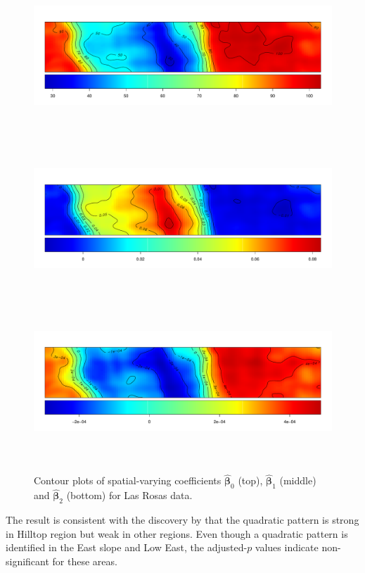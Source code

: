 \documentclass[a4paper]{article}   	%
\begin{document}
	\begin{figure}[!htp]
		\centering	
		\includegraphics[width=\textwidth, height=6cm]{Images/STRand_b0}
		\includegraphics[width=\textwidth, height=6cm]{Images/STRand_b1}
		\includegraphics[width=\textwidth, height=6cm]{Images/STRand_b2}
		\caption{Contour plots of spatial-varying coefficients $\hat{\bm{\beta}}_0$ (top), $\hat{\bm{\beta}}_1$ (middle) and $\hat{\bm{\beta}}_2$ (bottom) for Las Rosas data.  }\label{fig:betasprd}
	\end{figure}
	
	The result is consistent with the discovery by \textcite{Rakshit2020Novel} that the quadratic pattern is strong in Hilltop region but weak in other regions. Even though a quadratic pattern is identified in the East slope and Low East, the adjusted-$p$ values indicate non-significant for these areas. 
	
\end{document}
